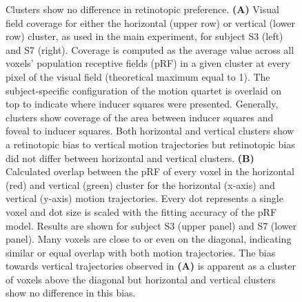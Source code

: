 \begin{figure}[ht!]
\ContinuedFloat
\captionsetup{labelformat=adja-page}
\caption{Clusters show no difference in retinotopic preference. \textbf{(A)} Visual field coverage for either the horizontal (upper row) or vertical (lower row) cluster, as used in the main experiment, for subject S3 (left) and S7 (right). Coverage is computed as the average value across all voxels' population receptive fields (pRF) in a given cluster at every pixel of the visual field (theoretical maximum equal to 1). The subject-specific configuration of the motion quartet is overlaid on top to indicate where inducer squares were presented. Generally, clusters show coverage of the area between inducer squares and foveal to inducer squares. Both horizontal and vertical clusters show a retinotopic bias to vertical motion trajectories but retinotopic bias did not differ between horizontal and vertical clusters. \textbf{(B)} Calculated overlap between the pRF of every voxel in the horizontal (red) and vertical (green) cluster for the horizontal (x-axis) and vertical (y-axis) motion trajectories. Every dot represents a single voxel and dot size is scaled with the fitting accuracy of the pRF model. Results are shown for subject S3 (upper panel) and S7 (lower panel). Many voxels are close to or even on the diagonal, indicating similar or equal overlap with both motion trajectories. The bias towards vertical trajectories observed in \textbf{(A)} is apparent as a cluster of voxels above the diagonal but horizontal and vertical clusters show no difference in this bias.}
\label{fig:figH_retinotopy}
\noindent\hrulefill
\end{figure}

